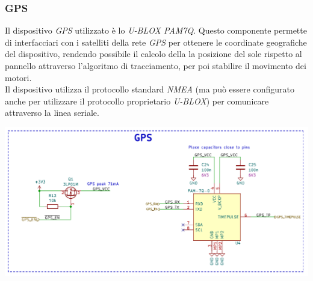 \hypertarget{gps}{%
\subsubsection{\texorpdfstring{\hfill\break
\hfill\break
GPS }{  GPS }}\label{gps}}

Il dispositivo \emph{GPS} utilizzato è lo \emph{U-BLOX PAM7Q}. Questo
componente permette di interfacciari con i satelliti della rete \emph{GPS}
per ottenere le coordinate geografiche del dispositivo, rendendo possibile 
il calcolo della la posizione del sole rispetto al
pannello attraverso l'algoritmo di tracciamento, per poi
stabilire il movimento dei motori.\\
Il dispositivo utilizza il protocollo standard \emph{NMEA} (ma può
essere configurato anche per utilizzare il protocollo proprietario
\emph{U-BLOX}) per comunicare attraverso la linea seriale.

\begin{center}
\includegraphics[scale=0.5]{figures/image26.png}
\captionsetup{type=figure}
\end{center}

